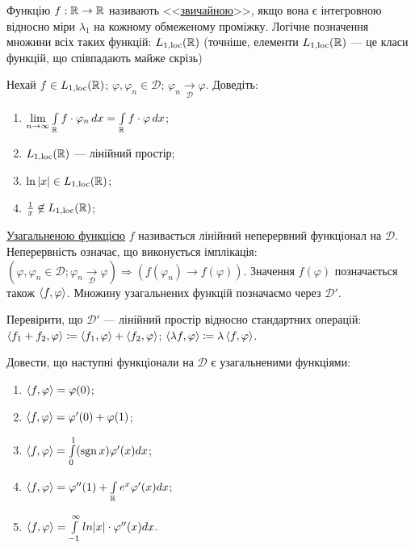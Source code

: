 \begin{theory}
    Функцію $f: \mathbb{R} \to \mathbb{R}$ називають <<\ul{звичайною}>>, якщо вона є інтегровною
    відносно міри $\lambda_1$ на кожному обмеженому проміжку. Логічне позначення множини
    всіх таких функцій: $L_{1,\mathrm{loc}}(\mathbb{R})$ (точніше, елементи $L_{1,\mathrm{loc}}(\mathbb{R})$
    --- це класи функцій, що співпадають майже скрізь)
\end{theory}

\begin{exercise}
    Нехай $f \in L_{1,\mathrm{loc}}(\mathbb{R})$; $\varphi, \varphi_n \in \mathcal{D}$;
    $\varphi_n \underset{\mathcal{D}}{\to} \varphi$. Доведіть:
    \begin{enumerate}
        \item $\lim\limits_{n\to\infty} \int\limits_{\mathbb{R}}^{} f\cdot \varphi_n \,dx
              = \int\limits_{\mathbb{R}}^{} f\cdot \varphi \,dx$;
        \item $L_{1,\mathrm{loc}}(\mathbb{R})$ --- лінійний простір;
        \item $\ln|x| \in L_{1,\mathrm{loc}}(\mathbb{R})$;
        \item $\frac{1}{x} \not\in L_{1,\mathrm{loc}}(\mathbb{R})$;
    \end{enumerate}
\end{exercise}

\begin{theory}
    \ul{Узагальненою функцією} $f$ називається лінійний неперервний функціонал на $\mathcal{D}$.
    Неперервність означає, що виконується імплікація: $(\varphi, \varphi_n \in \mathcal{D};
    \varphi_n \underset{\mathcal{D}}{\to} \varphi)  \Rightarrow (f(\varphi_n) \to f(\varphi))$.
    Значення $f(\varphi)$ позначається також $\left\langle f, \varphi\right\rangle$. Множину узагальнених
    функцій позначаємо через $\mathcal{D}'$.
\end{theory}

\begin{exercise}
    Перевірити, що $\mathcal{D}'$ --- лінійний простір відносно стандартних операцій:
    $\left\langle f_1 + f_2, \varphi\right\rangle \coloneqq \left\langle f_1, \varphi\right\rangle + \left\langle f_2, \varphi\right\rangle$;
    $\left\langle\lambda f, \varphi\right\rangle \coloneqq \lambda \left\langle f, \varphi\right\rangle$.
\end{exercise}

\begin{exercise}
    Довести, що наступні функціонали на $\mathcal{D}$ є узагальненими функціями:
    \begin{enumerate}
        \item $\left\langle f, \varphi\right\rangle = \varphi(0)$;
        \item $\left\langle f, \varphi\right\rangle = \varphi'(0) + \varphi(1)$;
        \item $\left\langle f, \varphi\right\rangle = \int\limits_{0}^{1} (\operatorname{sgn} x) \varphi'(x) dx$;
        \item $\left\langle f, \varphi\right\rangle = \varphi''(1) + \int\limits_{\mathbb{R}}^{} e^x \varphi'(x) dx$;
        \item $\left\langle f, \varphi\right\rangle = \int\limits_{-1}^{\infty} ln|x| \cdot \varphi''(x) dx$.
    \end{enumerate}
\end{exercise}

